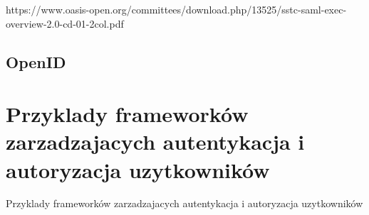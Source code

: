 https://www.oasis-open.org/committees/download.php/13525/sstc-saml-exec-overview-2.0-cd-01-2col.pdf

\subsection{OpenID}


\section{Przyklady frameworków zarzadzajacych autentykacja i autoryzacja uzytkowników}
\label{sec:frameworki}

Przyklady frameworków zarzadzajacych autentykacja i autoryzacja uzytkowników


